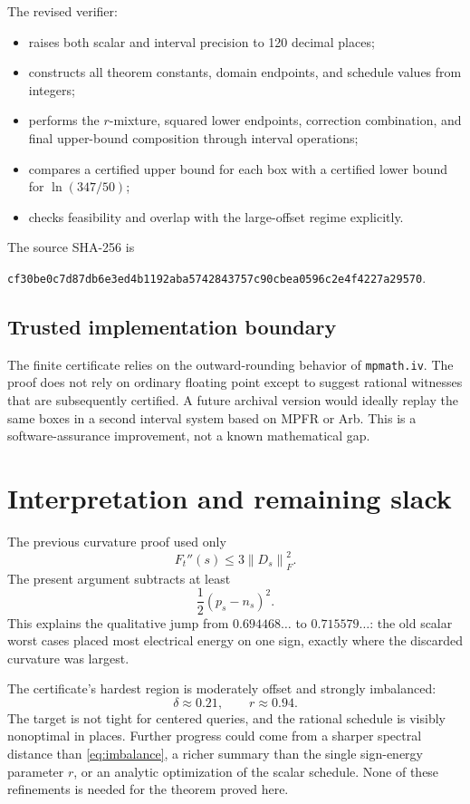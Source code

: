 \documentclass[11pt]{article}
\theoremstyle{definition}
\newcommand{\norm}[1]{\left\lVert #1\right\rVert}
\begin{document}
The revised verifier:
\begin{itemize}
  \item raises both scalar and interval precision to 120 decimal places;
  \item constructs all theorem constants, domain endpoints, and schedule values from integers;
  \item performs the $r$-mixture, squared lower endpoints, correction combination, and final upper-bound composition through interval operations;
  \item compares a certified upper bound for each box with a certified lower bound for $\ln(347/50)$;
  \item checks feasibility and overlap with the large-offset regime explicitly.
\end{itemize}
The source SHA-256 is
\begin{center}
\texttt{cf30be0c7d87db6e3ed4b1192aba5742843757c90cbea0596c2e4f4227a29570}.
\end{center}

\subsection{Trusted implementation boundary}
The finite certificate relies on the outward-rounding behavior of \texttt{mpmath.iv}.  The proof does not rely on ordinary floating point except to suggest rational witnesses that are subsequently certified.  A future archival version would ideally replay the same boxes in a second interval system based on MPFR or Arb.  This is a software-assurance improvement, not a known mathematical gap.

\section{Interpretation and remaining slack}

The previous curvature proof used only
\[
  F_t''(s)\le3\norm{D_s}_F^2.
\]
The present argument subtracts at least
\[
  \frac12(p_s-n_s)^2.
\]
This explains the qualitative jump from $0.694468\ldots$ to $0.715579\ldots$: the old scalar worst cases placed most electrical energy on one sign, exactly where the discarded curvature was largest.

The certificate's hardest region is moderately offset and strongly imbalanced:
\[
  \delta\approx0.21,
  \qquad
  r\approx0.94.
\]
The target is not tight for centered queries, and the rational schedule is visibly nonoptimal in places.  Further progress could come from a sharper spectral distance than \cref{eq:imbalance}, a richer summary than the single sign-energy parameter $r$, or an analytic optimization of the scalar schedule.  None of these refinements is needed for the theorem proved here.
\end{document}

